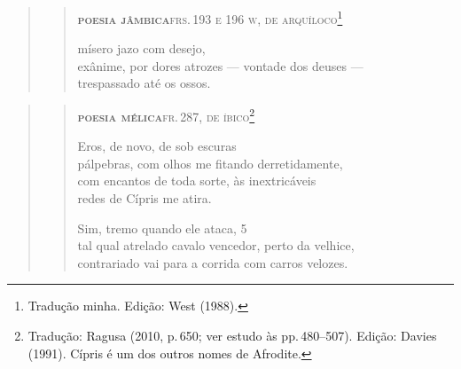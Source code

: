 \medskip

\begin{quote}
\begin{verse}
\textsc{\textbf{poesia jâmbica}\quad frs.\,193 e 196 w, de arquíloco}\footnote{Tradução minha. Edição: West (1988).}\\

\medskip

\hspace*{4.5em}mísero jazo com desejo,\\
\hspace*{2em}exânime, por dores atrozes --- vontade dos deuses ---\\
\hspace*{4.5em}trespassado até os ossos.\\

\medskip

\end{verse}
\end{quote}

\medskip

\begin{quote}
\begin{verse}

\pagebreak
\textsc{\textbf{poesia mélica}\quad fr.\,287, de íbico}\footnote{Tradução: Ragusa (2010, p.\,650; ver estudo às pp.\,480--507). Edição: Davies (1991). Cípris é um dos outros nomes de Afrodite.}\\

\medskip

Eros, de novo, de sob escuras\\
pálpebras, com olhos me fitando derretidamente,\\ 
com encantos de toda sorte, às inextricáveis\\
redes de Cípris me atira.\\

\medskip

Sim, tremo quando ele ataca, \num{5}\\
tal qual atrelado cavalo vencedor, perto da velhice,\\
contrariado vai para a corrida com carros velozes.

\end{verse}
\end{quote}

\medskip

